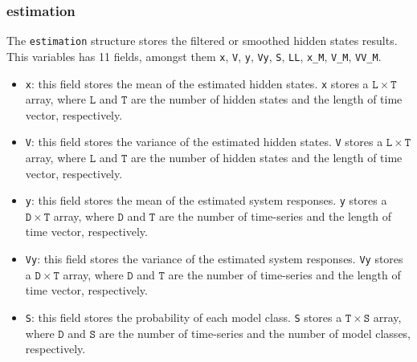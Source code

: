\subsubsection{estimation} 
The \lstinline[basicstyle = \mlttfamily \small ]!estimation! structure stores the filtered or smoothed hidden states results.
This variables has 11 fields, amongst them \lstinline[basicstyle = \mlttfamily \small ]!x!, \lstinline[basicstyle = \mlttfamily \small ]!V!, \lstinline[basicstyle = \mlttfamily \small ]!y!, \lstinline[basicstyle = \mlttfamily \small ]!Vy!,  \lstinline[basicstyle = \mlttfamily \small ]!S!, \lstinline[basicstyle = \mlttfamily \small ]!LL!, \lstinline[basicstyle = \mlttfamily \small ]!x_M!, \lstinline[basicstyle = \mlttfamily \small ]!V_M!, \lstinline[basicstyle = \mlttfamily \small ]!VV_M!.

\begin{itemize}
\item \lstinline[basicstyle = \mlttfamily \small ]!x!: this field stores the mean of the estimated hidden states. \lstinline[basicstyle = \mlttfamily \small ]!x! stores a $\mathtt{L} \times \mathtt{T}$ array, where $\mathtt{L}$ and $\mathtt{T}$ are the number of hidden states and the length of time vector, respectively. 
\item \lstinline[basicstyle = \mlttfamily \small ]!V!: this field stores the variance of the estimated hidden states. \lstinline[basicstyle = \mlttfamily \small ]!V! stores a $\mathtt{L} \times \mathtt{T}$ array, where $\mathtt{L}$ and $\mathtt{T}$ are the number of hidden states and the length of time vector, respectively. 
\item \lstinline[basicstyle = \mlttfamily \small ]!y!: this field stores the mean of the estimated system responses. \lstinline[basicstyle = \mlttfamily \small ]!y! stores a $\mathtt{D} \times \mathtt{T}$ array, where $\mathtt{D}$ and $\mathtt{T}$ are the number of time-series and the length of time vector, respectively. 
\item \lstinline[basicstyle = \mlttfamily \small ]!Vy!: this field stores the variance of the estimated system responses. \lstinline[basicstyle = \mlttfamily \small ]!Vy! stores a $\mathtt{D} \times \mathtt{T}$ array, where $\mathtt{D}$ and $\mathtt{T}$ are the number of time-series and the length of time vector, respectively. 
\item \lstinline[basicstyle = \mlttfamily \small ]!S!: this field stores the probability of each model class. \lstinline[basicstyle = \mlttfamily \small ]!S! stores a $\mathtt{T} \times \mathtt{S}$ array, where $\mathtt{D}$ and $\mathtt{S}$ are the number of time-series and the number of model classes, respectively. 

\end{itemize}
